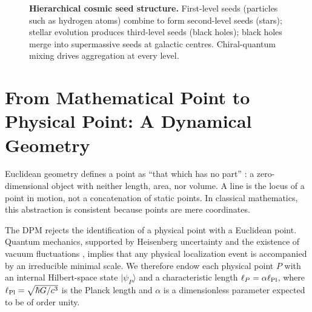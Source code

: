 \documentclass[11pt,a4paper]{article}
\begin{document}
\begin{figure}[htbp]
\centering
{}
\caption{\textbf{Hierarchical cosmic seed structure.} First-level seeds (particles such as hydrogen atoms) combine to form second-level seeds (stars); stellar evolution produces third-level seeds (black holes); black holes merge into supermassive seeds at galactic centres. Chiral-quantum mixing drives aggregation at every level.}
\label{fig:seeds}
\end{figure}

\section{From Mathematical Point to Physical Point: A Dynamical Geometry}

Euclidean geometry defines a point as ``that which has no part'' \cite{euclid}: a zero-dimensional object with neither length, area, nor volume. A line is the locus of a point in motion, not a concatenation of static points. In classical mathematics, this abstraction is consistent because points are mere coordinates.

The DPM rejects the identification of a physical point with a Euclidean point. Quantum mechanics, supported by Heisenberg uncertainty and the existence of vacuum fluctuations \cite{casimir1948}, implies that any physical localization event is accompanied by an irreducible minimal scale. We therefore endow each physical point $P$ with an internal Hilbert-space state $|\psi_P\rangle$ and a characteristic length $\ell_P = \alpha \ell_{\rm Pl}$, where $\ell_{\rm Pl} = \sqrt{\hbar G/c^3}$ is the Planck length and $\alpha$ is a dimensionless parameter expected to be of order unity.
\end{document}
